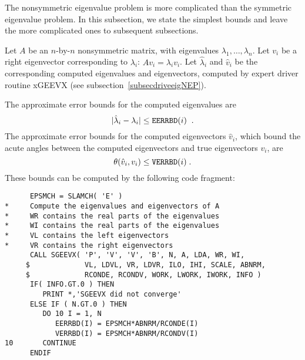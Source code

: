 The nonsymmetric eigenvalue
problem is more
complicated than the
symmetric eigenvalue problem. In this subsection,
we state the simplest bounds and leave the more complicated ones to
subsequent subsections.

Let $A$ be an $n$-by-$n$ nonsymmetric matrix, with eigenvalues
$\lambda_1, \ldots , \lambda_n$. Let $v_i$ be a right eigenvector
corresponding to $\lambda_i$: $A v_i = \lambda_i v_i$.
Let $\hat{\lambda}_i$ and $\hat{v}_i$ be the corresponding
computed eigenvalues and eigenvectors, computed by expert driver routine
xGEEVX (see subsection~\ref{subsecdriveeigNEP}).

The approximate error bounds for the computed eigenvalues are
\[
| \hat{\lambda}_i - \lambda_i | \leq {\tt EERRBD}(i) \; \; .
\]
The approximate error
bounds
for the computed eigenvectors $\hat{v}_i$,
which bound the acute angles between the computed eigenvectors and true
eigenvectors $v_i$, are
\[
\theta ( \hat{v}_i , v_i ) \leq {\tt VERRBD}(i) \; .
\]
These bounds can be computed by the following code fragment:

\begin{verbatim}
      EPSMCH = SLAMCH( 'E' )
*     Compute the eigenvalues and eigenvectors of A
*     WR contains the real parts of the eigenvalues
*     WI contains the real parts of the eigenvalues
*     VL contains the left eigenvectors
*     VR contains the right eigenvectors
      CALL SGEEVX( 'P', 'V', 'V', 'B', N, A, LDA, WR, WI,
     $             VL, LDVL, VR, LDVR, ILO, IHI, SCALE, ABNRM,
     $             RCONDE, RCONDV, WORK, LWORK, IWORK, INFO )
      IF( INFO.GT.0 ) THEN
         PRINT *,'SGEEVX did not converge'
      ELSE IF ( N.GT.0 ) THEN
         DO 10 I = 1, N
            EERRBD(I) = EPSMCH*ABNRM/RCONDE(I)
            VERRBD(I) = EPSMCH*ABNRM/RCONDV(I)
10       CONTINUE
      ENDIF
\end{verbatim}

